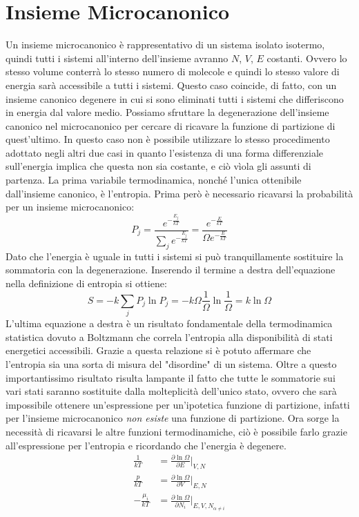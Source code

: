 \documentclass[oneside]{amsbook}
\numberwithin{section}{chapter}
\numberwithin{equation}{section}
\numberwithin{figure}{section}
\begin{document}
\section{Insieme Microcanonico}
Un insieme microcanonico è rappresentativo di un sistema isolato isotermo, quindi tutti i sistemi all'interno dell'insieme avranno $N$, $V$, $E$ costanti. Ovvero lo stesso volume conterrà lo stesso numero di molecole e quindi lo stesso valore di energia sarà accessibile a tutti i sistemi. Questo caso coincide, di fatto, con un insieme canonico degenere in cui si sono eliminati tutti i sistemi che differiscono in energia dal valore medio.
Possiamo sfruttare la degenerazione dell'insieme canonico nel microcanonico per cercare di ricavare la funzione di partizione di quest'ultimo. In questo caso non è possibile utilizzare lo stesso procedimento adottato negli altri due casi in quanto l'esistenza di una forma differenziale sull'energia implica che questa non sia costante, e ciò vìola gli assunti di partenza.
La prima variabile termodinamica, nonché l'unica ottenibile dall'insieme canonico, è l'entropia. Prima però è necessario ricavarsi la probabilità per un insieme microcanonico:
\begin{equation}
P_j= \frac{e^{-\frac{E_j}{kT}}}{\sum_j e^{-\frac{E_j}{kT}}}=  \frac{e^{-\frac{E}{kT}}}{\Omega e^{-\frac{E}{kT}}}
\end{equation}
Dato che l'energia è uguale in tutti i sistemi si può tranquillamente sostituire la sommatoria con la degenerazione.
Inserendo il termine a destra dell'equazione nella definizione di entropia si ottiene:
\begin{equation}
S=-k\sum_j P_j \ln P_j=-k\Omega\frac{1}{\Omega}\ln\frac{1}{\Omega}=k\ln\Omega
\end{equation}
L'ultima equazione a destra è un risultato fondamentale della termodinamica statistica dovuto a Boltzmann che correla l'entropia alla disponibilità di stati energetici accessibili. Grazie a questa relazione si è potuto affermare che l'entropia sia una sorta di misura del "disordine" di un sistema.
Oltre a questo importantissimo risultato risulta lampante il fatto che tutte le sommatorie sui vari stati saranno sostituite dalla molteplicità dell'unico stato, ovvero che sarà impossibile ottenere un'espressione per un'ipotetica funzione di partizione, infatti per l'insieme microcanonico \emph{non esiste} una funzione di partizione.
Ora sorge la necessità di ricavarsi le altre funzioni termodinamiche, ciò è possibile farlo grazie all'espressione per l'entropia e ricordando che l'energia  è degenere.
\begin{equation}
\begin{aligned}
\frac{1}{kT}&=\frac{\partial\ln\Omega}{\partial E}\biggr\rvert_{V,N}\\\frac{p}{kT}&=\frac{\partial\ln\Omega}{\partial V}\biggr\rvert_{E,N}\\-\frac{\mu_i}{kT}&=\frac{\partial\ln\Omega}{\partial N_i}\biggr\rvert_{E,V,N_{\alpha\neq i}}\end{aligned}
\end{equation}
\end{document}
